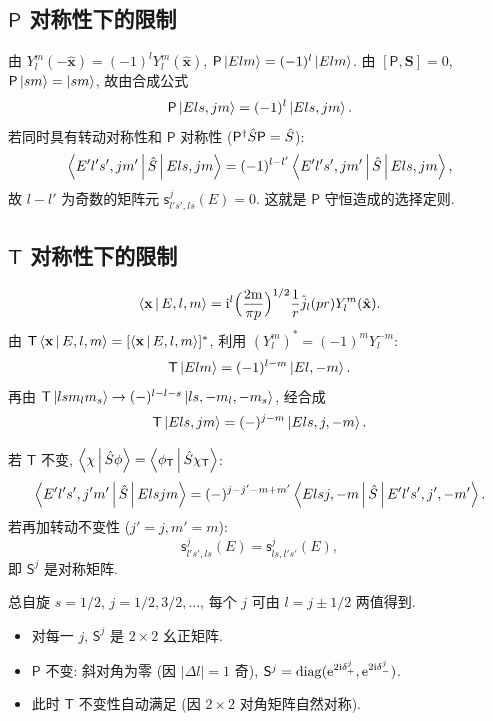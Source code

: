 \subsection{$\mathsf{P}$ 对称性下的限制}

由 $Y_l^m(-\hat{\mathbf{x}})=(-1)^l Y_l^m(\hat{\mathbf{x}})$, $\mathsf{P}\ket{Elm}=(-1)^l\ket{Elm}$. 由 $[\mathsf{P},\mathbf{S}]=0$, $\mathsf{P}\ket{sm}=\ket{sm}$, 故由合成公式
\begin{equation}
\mathsf{P}\ket{Els,jm}=(-1)^l \ket{Els,jm}.
\end{equation}
若同时具有转动对称性和 $\mathsf{P}$ 对称性 ($\mathsf{P}^\dagger \hat{S} \mathsf{P}=\hat{S}$):
\[
\left\langle E'l's',jm' \,\middle|\, \hat{S} \,\middle|\, Els,jm \right\rangle=(-1)^{l-l'}\left\langle E'l's',jm' \,\middle|\, \hat{S} \,\middle|\, Els,jm \right\rangle,
\]
故 $l-l'$ 为奇数的矩阵元 $\mathsf{s}^j_{l's',ls}(E)=0$. 这就是 $\mathsf{P}$ 守恒造成的选择定则.

\subsection{$\mathsf{T}$ 对称性下的限制}

\[
\left\langle \mathbf{x} \,\middle|\, E,l,m \right\rangle=\mathrm{i}^l \Bigl(\frac{2\mathrm{m}}{\pi p}\Bigr)^{1/2}\frac{1}{r}\hat{j}_l(pr)Y_l^m(\hat{\mathbf{x}}).
\]
由 $\mathsf{T}\left\langle \mathbf{x} \,\middle|\, E,l,m \right\rangle=[\left\langle \mathbf{x} \,\middle|\, E,l,m \right\rangle]^*$, 利用 $(Y_l^m)^*=(-1)^m Y_l^{-m}$:
\[
\mathsf{T}\ket{Elm}=(-1)^{l-m}\ket{El,-m}.
\]
再由 $\mathsf{T}\ket{lsm_lm_s}\to (-)^{l-l-s}\ket{ls,-m_l,-m_s}$, 经合成
\begin{equation}
\mathsf{T}\ket{Els,jm}=(-)^{j-m}\ket{Els,j,-m}.
\end{equation}

若 $\mathsf{T}$ 不变, $\left\langle \chi \,\middle|\, \hat{S} \phi \right\rangle=\left\langle \phi_{\mathsf{T}} \,\middle|\, \hat{S} \chi_{\mathsf{T}} \right\rangle$:
\[
\left\langle E'l's',j'm' \,\middle|\, \hat{S} \,\middle|\, Elsjm \right\rangle=(-)^{j-j'-m+m'}\left\langle Elsj,-m \,\middle|\, \hat{S} \,\middle|\, E'l's',j',-m' \right\rangle.
\]
若再加转动不变性 ($j'=j,m'=m$):
\begin{equation}\label{eq:S-symmetric}
\mathsf{s}^j_{l's',ls}(E)=\mathsf{s}^j_{ls,l's'}(E),
\end{equation}
即 $\mathsf{S}^j$ 是对称矩阵.

\begin{example}[自旋 $1/2$ - 自旋 $0$ 散射]
总自旋 $s=1/2$, $j=1/2,3/2,\ldots$, 每个 $j$ 可由 $l=j\pm 1/2$ 两值得到.
\begin{itemize}
  \item 对每一 $j$, $\mathsf{S}^j$ 是 $2\times 2$ 幺正矩阵.
  \item $\mathsf{P}$ 不变: 斜对角为零 (因 $|\Delta l|=1$ 奇), $\mathsf{S}^j=\mathrm{diag}(\mathrm{e}^{2\mathrm{i} \delta^j_+}, \mathrm{e}^{2\mathrm{i} \delta^j_-})$.
  \item 此时 $\mathsf{T}$ 不变性自动满足 (因 $2\times 2$ 对角矩阵自然对称).
\end{itemize}
\end{example}


